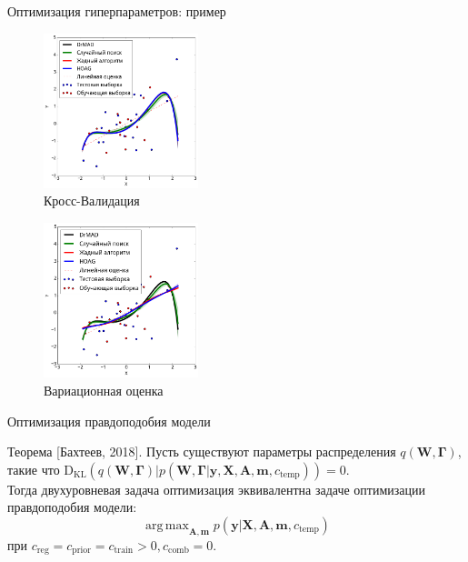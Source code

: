 \documentclass[usenames,dvipsnames,11pt,pdf,utf8,russian,aspectratio=43]{beamer}
\DeclareMathOperator*{\argmax}{arg\,max}
\begin{document}
\begin{frame}{Оптимизация гиперпараметров: пример}
\begin{multicols}{2}
\begin{figure}[h]
\includegraphics[width=0.4\textwidth]{./slide_plots/poly_cv.png}
\caption*{Кросс-Валидация}
\end{figure}

\begin{figure}[h]
\includegraphics[width=0.4\textwidth]{./slide_plots/poly_var.png}
\caption*{Вариационная оценка}
\end{figure}
\end{multicols}

\end{frame}






\begin{frame}{Оптимизация правдоподобия модели}
\begin{block}{Теорема  [Бахтеев, 2018].}
Пусть существуют параметры распределения $q(\mathbf{W}, \boldsymbol{\Gamma})$, такие что $\text{D}_\text{KL}(q(\mathbf{W}, \boldsymbol{\Gamma})|p(\mathbf{W},  \boldsymbol{\Gamma}| \mathbf{y}, \mathbf{X}, \mathbf{A}, \mathbf{m}, c_\text{temp})) = 0$.\\
Тогда двухуровневая задача оптимизация эквивалентна задаче оптимизации правдоподобия модели:
$$\argmax_{\mathbf{A}, \mathbf{m}}  p(\mathbf{y}|\mathbf{X},\mathbf{A},\mathbf{m}, c_{\text{temp}})$$ 
при $c_{\text{reg}} = c_{\text{prior}} = c_{\text{train}} >0, c_{\text{comb}} = 0$. 
\end{block}
~\\

\end{frame}
\end{document}
